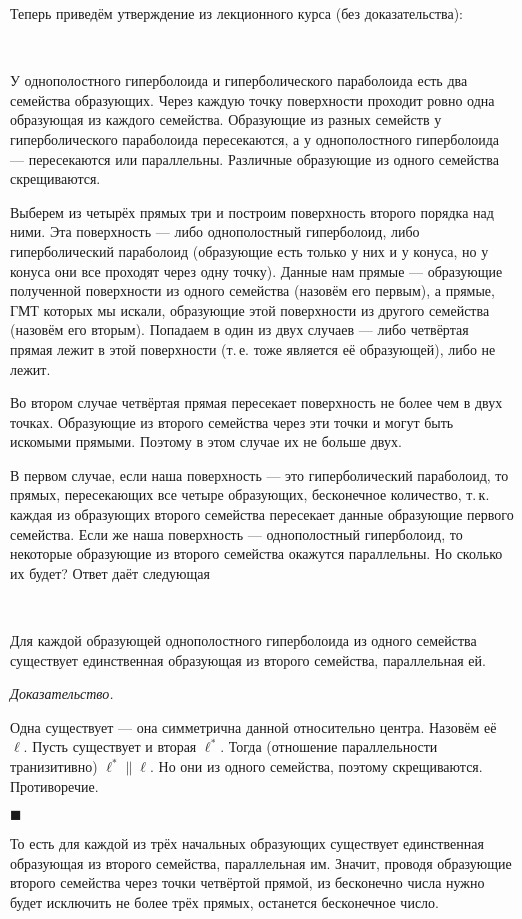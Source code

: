 \documentclass[a4paper, 12pt]{article}
\renewenvironment{proof}{
    \smallskip\noindent\textit{Доказательство.}
}{
    \hfill$\blacksquare$\par\smallskip
}
\newcounter{lemma}
\newenvironment{lemma}[1][]{
    \refstepcounter{lemma}
    \smallskip\noindent{\bfseries Лемма \thelemma.}\,
}{
    \par\smallskip
}
\begin{document}
Теперь приведём утверждение из лекционного курса (без доказательства):

\begin{lemma}
    У однополостного гиперболоида и гиперболического параболоида есть два семейства образующих. Через каждую точку поверхности проходит ровно одна образующая из каждого семейства. Образующие из разных семейств у гиперболического параболоида пересекаются, а у однополостного гиперболоида --- пересекаются или параллельны. Различные образующие из одного семейства скрещиваются.
\end{lemma}

Выберем из четырёх прямых три и построим поверхность второго порядка над ними. Эта поверхность --- либо однополостный гиперболоид, либо гиперболический параболоид (образующие есть только у них и у конуса, но у конуса они все проходят через одну точку). Данные нам прямые --- образующие полученной поверхности из одного семейства (назовём его первым), а прямые, ГМТ которых мы искали, образующие этой поверхности из другого семейства (назовём его вторым). Попадаем в один из двух случаев --- либо четвёртая прямая лежит в этой поверхности (т.\,е. тоже является её образующей), либо не лежит. 

Во втором случае четвёртая прямая пересекает поверхность не более чем в двух точках. Образующие из второго семейства через эти точки и могут быть искомыми прямыми. Поэтому в этом случае их не больше двух.

В первом случае, если наша поверхность --- это гиперболический параболоид, то прямых, пересекающих все четыре образующих, бесконечное количество, т.\,к. каждая из образующих второго семейства пересекает данные образующие первого семейства. Если же наша поверхность --- однополостный гиперболоид, то некоторые образующие из второго семейства окажутся параллельны. Но сколько их будет? Ответ даёт следующая

\begin{lemma}
    Для каждой образующей однополостного гиперболоида из одного семейства существует единственная образующая из второго семейства, параллельная ей.
\end{lemma}

\begin{proof}
    Одна существует --- она симметрична данной относительно центра. Назовём её $\ell$. Пусть существует и вторая $\ell^\ast$. Тогда (отношение параллельности транизитивно) $\ell^\ast \parallel \ell$. Но они из одного семейства, поэтому скрещиваются. Противоречие.
\end{proof}

То есть для каждой из трёх начальных образующих существует единственная образующая из второго семейства, параллельная им. Значит, проводя образующие второго семейства через точки четвёртой прямой, из бесконечно числа нужно будет исключить не более трёх прямых, останется бесконечное число.
\end{document}
